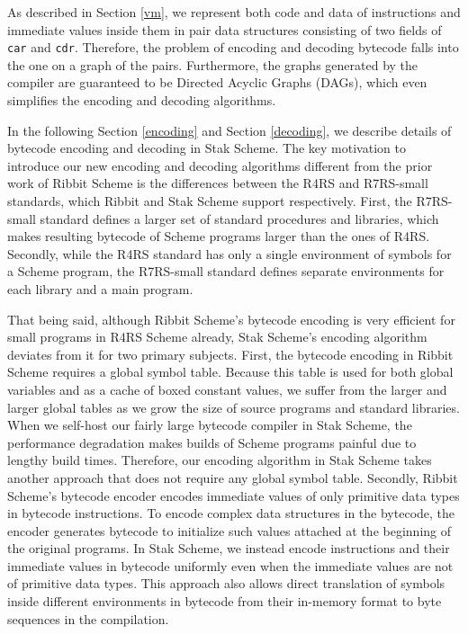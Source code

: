 \documentclass[sigplan]{acmart}
\begin{document}
As described in Section \ref{vm},
we represent both code and data of instructions and immediate
values inside them in pair data structures consisting of two fields of
\texttt{car} and \texttt{cdr}.
Therefore, the problem of encoding and decoding bytecode falls into
the one on a graph of the pairs.
Furthermore, the graphs generated by the compiler are guaranteed to be
Directed Acyclic Graphs (DAGs), which even simplifies the encoding
and decoding algorithms.

In the following Section \ref{encoding} and Section \ref{decoding},
we describe details of bytecode encoding and decoding in Stak Scheme.
The key motivation to introduce our new encoding and decoding
algorithms different from the prior work of Ribbit Scheme is the differences
between the R4RS and R7RS-small standards, which Ribbit and Stak Scheme
support respectively.
First, the R7RS-small standard defines a larger set of standard
procedures and libraries, which makes resulting bytecode of Scheme
programs larger than the ones of R4RS.
Secondly, while the R4RS standard has only a single environment of
symbols for a Scheme program, the R7RS-small standard defines
separate environments for each library and a main program.

That being said, although Ribbit Scheme's bytecode encoding is very efficient
for small programs in R4RS Scheme already, Stak Scheme's encoding algorithm
deviates from it for two primary subjects.
First, the bytecode encoding in Ribbit Scheme requires a global symbol table.
Because this table is used for both global variables and as a cache of
boxed constant values, we suffer from the larger and larger global tables
as we grow the size of source programs and standard libraries.
When we self-host our fairly large bytecode compiler in Stak Scheme,
the performance degradation makes builds of Scheme programs painful due
to lengthy build times.
Therefore, our encoding algorithm in Stak Scheme takes another approach that
does not require any global symbol table.
Secondly, Ribbit Scheme's bytecode encoder encodes
immediate values of only primitive data types in bytecode instructions.
To encode complex data structures in the bytecode, the encoder
generates bytecode to initialize such values attached at the
beginning of the original programs.
In Stak Scheme, we instead encode instructions and their immediate
values in bytecode uniformly even when the immediate values are not
of primitive data types.
This approach also allows direct translation of symbols inside
different environments in bytecode from their in-memory format to
byte sequences in the compilation.
\end{document}
